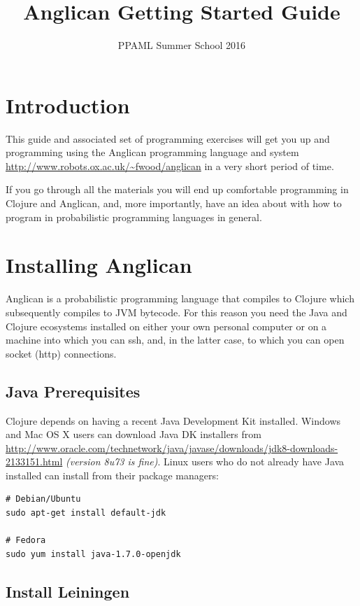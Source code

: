 \documentclass{article}
\title{Anglican Getting Started Guide}
\date{PPAML Summer School 2016}
\begin{document}
\maketitle

\section{Introduction}
This guide and associated set of programming exercises will get you up and programming 
using the Anglican programming language
and system \url{http://www.robots.ox.ac.uk/~fwood/anglican} in a very short period of time.

If you go through all the materials you will end up comfortable programming in Clojure 
and Anglican, and, more importantly, have an idea about with how to program in probabilistic
programming languages in general.

\section{Installing Anglican}

Anglican is a probabilistic programming language that compiles to Clojure which subsequently compiles to JVM bytecode.  For this reason
you need the Java and Clojure ecosystems installed on either your own personal computer or on a 
machine into which you can ssh, and, in the latter case, to which you can open socket (http) connections.  

\subsection{Java Prerequisites}

Clojure depends on having a recent Java Development Kit installed.  Windows and Mac OS X users can download Java DK installers from \url{http://www.oracle.com/technetwork/java/javase/downloads/jdk8-downloads-2133151.html} {\it (version 8u73 is fine)}. Linux users who do not already have Java installed can install from their package managers:

\begin{verbatim}
# Debian/Ubuntu
sudo apt-get install default-jdk

# Fedora
sudo yum install java-1.7.0-openjdk
\end{verbatim}

\subsection{Install Leiningen}
\end{document}
